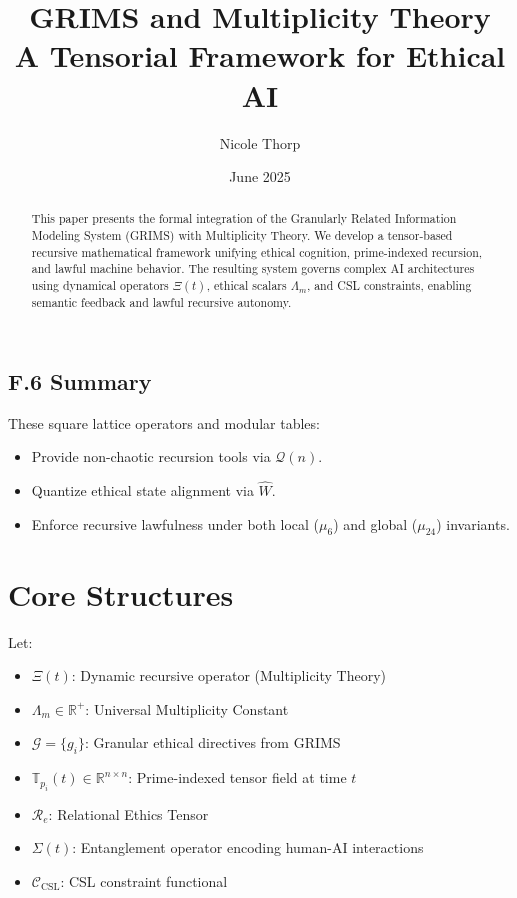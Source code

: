 \documentclass[12pt]{article}
\begin{document}
\subsection*{F.6 Summary}

These square lattice operators and modular tables:
\begin{itemize}
    \item Provide non-chaotic recursion tools via $\mathcal{Q}(n)$.
    \item Quantize ethical state alignment via $\hat{W}$.
    \item Enforce recursive lawfulness under both local ($\mu_6$) and global ($\mu_{24}$) invariants.
\end{itemize}

\clearpage


\title{\textbf{GRIMS and Multiplicity Theory\\ A Tensorial Framework for Ethical AI}}
\author{Nicole Thorp}
\date{June 2025}


\begin{abstract}
This paper presents the formal integration of the Granularly Related Information Modeling System (GRIMS) with Multiplicity Theory. We develop a tensor-based recursive mathematical framework unifying ethical cognition, prime-indexed recursion, and lawful machine behavior. The resulting system governs complex AI architectures using dynamical operators \( \Xi(t) \), ethical scalars \( \Lambda_m \), and CSL constraints, enabling semantic feedback and lawful recursive autonomy.
\end{abstract}

\section{Core Structures}
Let:
\begin{itemize}
    \item \( \Xi(t) \): Dynamic recursive operator (Multiplicity Theory)
    \item \( \Lambda_m \in \mathbb{R}^{+} \): Universal Multiplicity Constant
    \item \( \mathcal{G} = \{g_i\} \): Granular ethical directives from GRIMS
    \item \( \mathbb{T}_{p_i}(t) \in \mathbb{R}^{n \times n} \): Prime-indexed tensor field at time \( t \)
    \item \( \mathcal{R}_e \): Relational Ethics Tensor
    \item \( \Sigma(t) \): Entanglement operator encoding human-AI interactions
    \item \( \mathcal{C}_{\text{CSL}} \): CSL constraint functional
\end{itemize}
\end{document}
